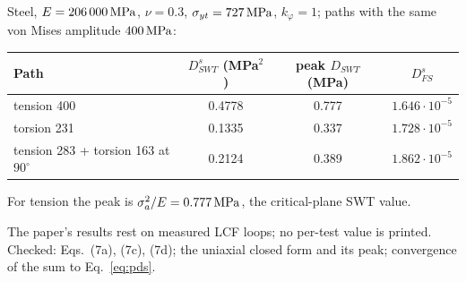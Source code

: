  Steel, $E=206\,000\,\mathrm{MPa}$, $\nu=0.3$, $\sigma_{yt}=727\,\mathrm{MPa}$, $k_\varphi=1$;
paths with the same von Mises amplitude $400\,\mathrm{MPa}$:
\begin{center}\small
\begin{tabular}{@{}lccc@{}}
\toprule
Path & $D^s_{SWT}$ (MPa$^2$) & peak $D_{SWT}$ (MPa) & $D^s_{FS}$\\\midrule
tension 400 & 0.4778 & 0.777 & $1.646\cdot10^{-5}$\\
torsion 231 & 0.1335 & 0.337 & $1.728\cdot10^{-5}$\\
tension 283 + torsion 163 at $90^\circ$ & 0.2124 & 0.389 & $1.862\cdot10^{-5}$\\
\bottomrule
\end{tabular}
\end{center}
For tension the peak is $\sigma_a^2/E=0.777\,\mathrm{MPa}$, the critical-plane SWT value.

 The paper's results rest on measured LCF loops; no per-test value is printed.
Checked: Eqs.~(7a), (7c), (7d); the uniaxial closed form and its peak; convergence of the sum to
Eq.~\eqref{eq:pds}.
